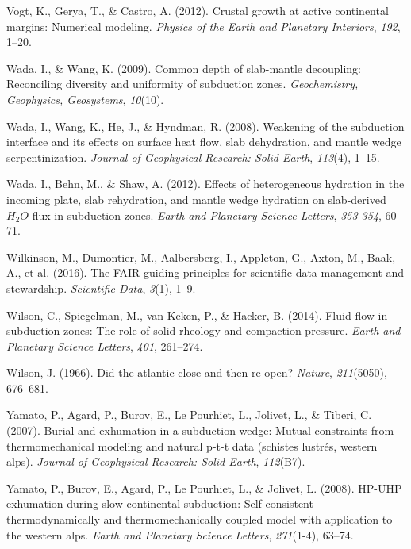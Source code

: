 \begin{CSLReferences}{1}{1}
\leavevmode{}%
Vogt, K., Gerya, T., \& Castro, A. (2012). Crustal growth at active continental margins: Numerical modeling. \emph{Physics of the Earth and Planetary Interiors}, \emph{192}, 1--20.

\leavevmode{}%
Wada, I., \& Wang, K. (2009). Common depth of slab-mantle decoupling: Reconciling diversity and uniformity of subduction zones. \emph{Geochemistry, Geophysics, Geosystems}, \emph{10}(10).

\leavevmode{}%
Wada, I., Wang, K., He, J., \& Hyndman, R. (2008). Weakening of the subduction interface and its effects on surface heat flow, slab dehydration, and mantle wedge serpentinization. \emph{Journal of Geophysical Research: Solid Earth}, \emph{113}(4), 1--15.

\leavevmode{}%
Wada, I., Behn, M., \& Shaw, A. (2012). Effects of heterogeneous hydration in the incoming plate, slab rehydration, and mantle wedge hydration on slab-derived \(H_2O\) flux in subduction zones. \emph{Earth and Planetary Science Letters}, \emph{353-354}, 60--71.

\leavevmode{}%
Wilkinson, M., Dumontier, M., Aalbersberg, I., Appleton, G., Axton, M., Baak, A., et al. (2016). The FAIR guiding principles for scientific data management and stewardship. \emph{Scientific Data}, \emph{3}(1), 1--9.

\leavevmode{}%
Wilson, C., Spiegelman, M., van Keken, P., \& Hacker, B. (2014). Fluid flow in subduction zones: The role of solid rheology and compaction pressure. \emph{Earth and Planetary Science Letters}, \emph{401}, 261--274.

\leavevmode{}%
Wilson, J. (1966). Did the atlantic close and then re-open? \emph{Nature}, \emph{211}(5050), 676--681.

\leavevmode{}%
Yamato, P., Agard, P., Burov, E., Le Pourhiet, L., Jolivet, L., \& Tiberi, C. (2007). Burial and exhumation in a subduction wedge: Mutual constraints from thermomechanical modeling and natural p-t-t data (schistes lustr{é}s, western alps). \emph{Journal of Geophysical Research: Solid Earth}, \emph{112}(B7).

\leavevmode{}%
Yamato, P., Burov, E., Agard, P., Le Pourhiet, L., \& Jolivet, L. (2008). HP-UHP exhumation during slow continental subduction: Self-consistent thermodynamically and thermomechanically coupled model with application to the western alps. \emph{Earth and Planetary Science Letters}, \emph{271}(1-4), 63--74.


\end{CSLReferences}
